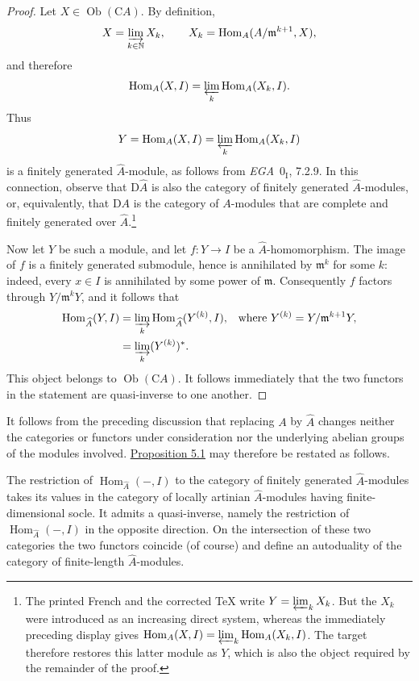 \documentclass[11pt,a4paper,oneside]{book}
\providecommand{\srcpage}[1]{%
  \marginpar{\raggedright\scriptsize\color{gray}Original French p.~#1}}
\providecommand{\mideal}{\mathfrak m}
\providecommand{\Homop}{\operatorname{Hom}}
\providecommand{\DA}{\mathrm D A}
\providecommand{\DhatA}{\mathrm D\widehat A}
\providecommand{\CA}{\mathrm C A}
\theoremstyle{plain}
\theoremstyle{definition}
\theoremstyle{remark}
\begin{document}
\begin{proof}
Let $X\in\operatorname{Ob}(\CA)$. By definition,
\[
  X=\varinjlim_{k\in\mathbb N}X_k,
  \qquad
  X_k=\Homop_A(A/\mideal^{k+1},X),
\]
and therefore
\[
  \Homop_A(X,I)=\varprojlim_k\Homop_A(X_k,I).
\]
Thus
\[
  Y=\Homop_A(X,I)=\varprojlim_k\Homop_A(X_k,I)
\]
is a finitely generated $\widehat A$-module, as follows from
\emph{EGA}~$0_{\mathrm I}$, 7.2.9. In this connection, observe that $\DhatA$
is also the category of finitely generated $\widehat A$-modules, or,
equivalently, that $\DA$ is the category of $A$-modules that are complete and
finitely generated over $\widehat A$.\footnote{The printed French and the
corrected TeX write $Y=\varprojlim_k X_k$.  But the $X_k$ were introduced as
an increasing direct system, whereas the immediately preceding display gives
$\Homop_A(X,I)=\varprojlim_k\Homop_A(X_k,I)$.  The target therefore restores
this latter module as $Y$, which is also the object required by the remainder
of the proof.}

Now let $Y$ be such a module, and let $f\colon Y\to I$ be a
$\widehat A$-homomorphism. The image of $f$ is a finitely generated
submodule, hence is annihilated by $\mideal^k$ for some $k$: indeed, every
$x\in I$ is annihilated by some power of $\mideal$. Consequently $f$ factors
through $Y/\mideal^kY$, and it follows that
\begin{align*}
  \Homop_{\widehat A}(Y,I)
    &=\varinjlim_k\Homop_{\widehat A}(Y^{(k)},I),
      &\text{where }Y^{(k)}&=Y/\mideal^{k+1}Y,\\
    &=\varinjlim_k (Y^{(k)})^*.
\end{align*}
This object belongs to $\operatorname{Ob}(\CA)$. It follows immediately that
the two functors in the statement are quasi-inverse to one another.
\end{proof}


It follows from the preceding discussion that replacing $A$ by $\widehat A$
changes neither the categories or functors under consideration nor the
underlying abelian groups of the modules involved. \hyperref[IV.5.1]{Proposition 5.1} may
therefore be restated as follows.\srcpage{58}

The restriction of $\Homop_{\widehat A}(-,I)$ to the category of finitely
generated $\widehat A$-modules takes its values in the category of locally
artinian $\widehat A$-modules having finite-dimensional socle. It admits a
quasi-inverse, namely the restriction of $\Homop_{\widehat A}(-,I)$ in the
opposite direction. On the intersection of these two categories the two
functors coincide (of course) and define an autoduality of the category of
finite-length $\widehat A$-modules.
\end{document}
